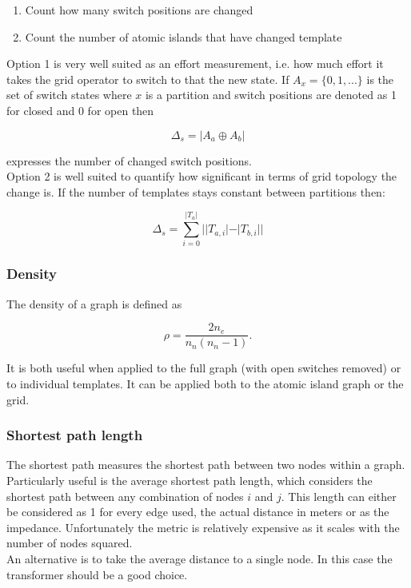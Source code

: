 \begin{enumerate}
  \item Count how many switch positions are changed
  \item Count the number of atomic islands that have changed template
\end{enumerate}

Option 1 is very well suited as an effort measurement, i.e. how much effort 
it takes the grid operator to switch to that the new state. If $A_x = \{0, 1, ...\}$ 
is the set of switch states where $x$ is a partition and switch positions
are denoted as 1 for closed and 0 for open then

\begin{equation}
\Delta_{s} = |A_a \oplus A_b|
\end{equation}

expresses the number of changed switch positions.\\

Option 2 is well suited to quantify how significant in terms of grid topology 
the change is. If the number of templates stays constant between partitions then:

\begin{equation}
  \Delta_s = \sum_{i=0}^{|T_a|} ||T_{a, i}| - |T_{b, i}||
\end{equation}

\subsubsection{Density}

The density of a graph is defined as

\begin{equation}
  \rho = \frac{2 n_e}{n_n(n_n-1)}.
\end{equation}

It is both useful when applied to the full graph (with open switches removed)
or to individual templates. It can be applied both to the atomic island 
graph or the grid.

\subsubsection{Shortest path length}\label{sec:shortest_path}

The shortest path measures the shortest path between two nodes within a graph.
Particularly useful is the average shortest path length, which considers
the shortest path between any combination of nodes $i$ and $j$. This length can
either be considered as 1 for every edge used, the actual distance in meters or
as the impedance. Unfortunately
the metric is relatively expensive as it scales with the number of nodes squared.\\
An alternative is to take the average distance to a single node. In this case the
transformer should be a good choice.

